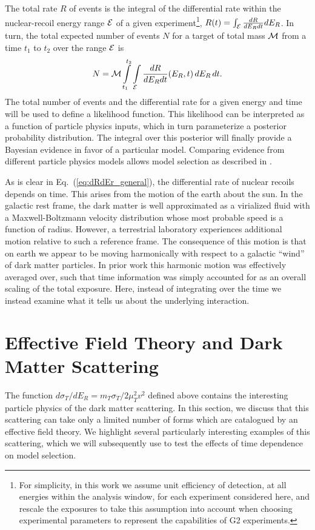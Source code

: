 \documentclass[11pt]{article}
\newcommand{\beq}{\begin{equation}} \newcommand{\eeq}{\end{equation}}
\newcommand{\Eq}[1]{Eq.~(\ref{#1})} \newcommand{\Eqs}[2]{Eqs.~(\ref{#1}) and (\ref{#2})} \newcommand{\Eqm}[2]{Eqs.~(\ref{#1}) through (\ref{#2})}
\begin{document}
The total rate $R$ of events is the integral of the differential rate within the nuclear-recoil energy range ${\cal E}$ of a given experiment\footnote{For simplicity, in this work we assume unit efficiency of detection, at all energies within the analysis window, for each experiment considered here, and rescale the exposures to take this assumption into account when choosing experimental parameters to represent the capabilities of G2 experiments.}, $R(t)=\int_{\cal E} \frac{dR}{dE_R dt} dE_R$. In turn, the total expected number of events $N$ for a target of total mass ${\cal M}$ from a time $t_1$ to $t_2$ over the range ${\cal E}$ is
\beq
N =  \cM \int\limits_{t_1}^{t_2} \int\limits_\cE  \frac{dR}{dE_R dt}(E_R,t)\,dE_R \,dt.
\eeq
The total number of events and the differential rate for a given energy and time will be used to define a likelihood function. This likelihood can be interpreted as a function of particle physics inputs, which in turn parameterize a posterior probability distribution. The integral over this posterior will finally provide a Bayesian evidence in favor of a particular model. Comparing evidence from different particle physics models allows model selection as described in \cite{Gluscevic:2014vga, Gluscevic:2015sqa}.

As is clear in \Eq{eq:dRdEr_general}, the differential rate of nuclear recoils depends on time. This arises from the motion of the earth about the sun. In the galactic rest frame, the dark matter is well approximated as a virialized fluid with a Maxwell-Boltzmann velocity distribution whose most probable speed is a function of radius. However, a terrestrial laboratory experiences additional motion relative to such a reference frame. The consequence of this motion is that on earth we appear to be moving harmonically with respect to a galactic ``wind'' of dark matter particles. In prior work this harmonic motion was effectively averaged over, such that time information was simply accounted for as an overall scaling of the total exposure. Here, instead of integrating over the time we instead examine what it tells us about the underlying interaction.




\section{Effective Field Theory and Dark Matter Scattering}

The function $d\sigma_T/dE_R=m_T \sigma_T /2\mu_T^2 v^2$ defined above contains the interesting particle physics of the dark matter scattering. In this section, we discuss that this scattering can take only a limited number of forms which are catalogued by an effective field theory. We highlight several particularly interesting examples of this scattering, which we will subsequently use to test the effects of time dependence on model selection.
\end{document}
